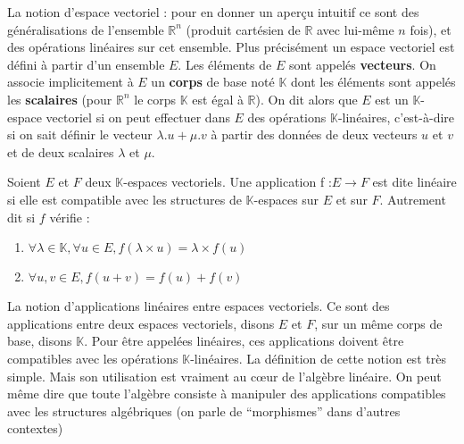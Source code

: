 \begin{maremarque}
	La notion d’espace vectoriel : pour en donner un aperçu intuitif ce sont des généralisations de l’ensemble $\mathbb{R}^n$ (produit cartésien de $\mathbb{R}$ avec lui-même $n$ fois), et des opérations linéaires sur cet ensemble. Plus précisément un espace vectoriel est défini à partir d’un ensemble $E$. Les éléments de $E$ sont appelés \textbf{vecteurs}. On associe implicitement à $E$ un \textbf{corps} de base noté $\mathbb{K}$ dont les éléments sont appelés les \textbf{scalaires} (pour $\mathbb{R}^n$ le corps $\mathbb{K}$ est égal à $\mathbb{R}$). On dit alors que $E$ est un $\mathbb{K}$-espace vectoriel si on peut effectuer dans $E$ des opérations $\mathbb{K}$-linéaires, c’est-à-dire si on sait définir le vecteur $\lambda.u+\mu.v$ à partir des données de deux vecteurs $u$ et $v$ et de deux scalaires $\lambda$ et $\mu$.
\end{maremarque}

\begin{madefinition}
	Soient $E$ et $F$ deux $\mathbb{K}$-espaces vectoriels. Une application f :$E \longrightarrow F$
	est dite linéaire si elle est compatible avec les structures de $\mathbb{K}$-espaces sur $E$ et
	sur $F$. Autrement dit si $f$ vérifie : 
	\begin{enumerate}
		\item $\forall \lambda \in \mathbb{K}, \forall u \in E, f(\lambda \times u) = \lambda \times f(u)$
		\item $\forall u,v \in E, f(u+v) = f(u)+f(v)$
	\end{enumerate}
\end{madefinition}

\begin{maremarque}
	La notion d’applications linéaires entre espaces vectoriels. Ce sont des applications entre deux espaces vectoriels, disons $E$ et $F$, sur un même corps de base, disons $\mathbb{K}$. Pour être appelées linéaires, ces applications doivent être compatibles avec les opérations $\mathbb{K}$-linéaires. La définition de cette notion est très simple. Mais son utilisation est vraiment au cœur de l’algèbre linéaire. On peut même dire que toute l’algèbre consiste à manipuler des applications compatibles avec les structures algébriques (on parle de “morphismes” dans d’autres contextes)
\end{maremarque}
